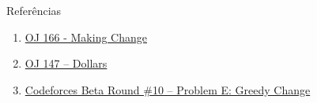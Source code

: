 \begin{frame}[fragile]{Referências}

    \begin{enumerate}
        \item \href{https://onlinejudge.org/index.php?option=com_onlinejudge&Itemid=8&category=24&page=show_problem&problem=102}{OJ 166 - Making Change} 

        \item \href{https://onlinejudge.org/index.php?option=onlinejudge&page=show_problem&problem=83}
            {OJ 147 -- Dollars}  


        \item \href{https://codeforces.com/problemset/problem/10/E}{Codeforces Beta Round \#10 --
            Problem E: Greedy Change}
    \end{enumerate}

\end{frame}
